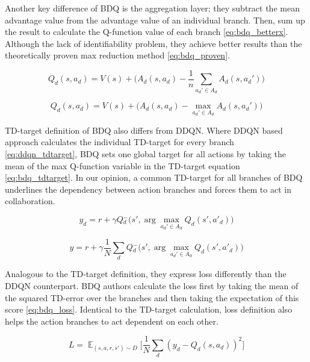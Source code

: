 Another key difference of BDQ is the aggregation layer; they subtract the mean advantage value from the advantage value of an individual branch. Then, sum up the result to calculate the Q-function value of each branch \ref{eq:bdq_betterx}. Although the lack of identifiability problem, they achieve better results than the theoretically proven max reduction method \ref{eq:bdq_proven}.

\begin{equation}
    Q_d(s, a_d) = V(s) + \Big(A_d(s, a_d) - \frac{1}{n} \sum\limits_{a_d'\in A_d}A_d(s, a_d')\Big)
    \label{eq:bdq_better}
\end{equation}


\begin{equation}
    Q_d(s, a_d) = V(s) + \Big(A_d(s, a_d) - \max\limits_{a_d'\in A_d}A_d(s, a_d')\Big)
    \label{eq:bdq_proven}
\end{equation}


TD-target definition of BDQ also differs from DDQN. Where DDQN based approach calculates the individual TD-target for every branch \ref{eq:ddqn_tdtarget}, BDQ sets one global target for all actions by taking the mean of the max Q-function variable in the TD-target equation \ref{eq:bdq_tdtarget}. In our opinion, a common TD-target for all branches of BDQ underlines the dependency between action branches and forces them to act in collaboration.

\begin{equation}
    y_d = r + \gamma Q{_d^-}\Big(s', \arg\max\limits_{a_d'\in A_d}Q_d(s', a'_d)\Big)
    \label{eq:ddqn_tdtarget}
\end{equation}

\begin{equation}
    y = r + \gamma \frac{1}{N} \sum\limits_d Q{_d^-}\Big(s', \arg\max\limits_{a_d'\in A_d}Q_d(s', a'_d)\Big)
    \label{eq:bdq_tdtarget}
\end{equation}


Analogous to the TD-target definition, they express loss differently than the DDQN counterpart. BDQ authors calculate the loss first by taking the mean of the squared TD-error over the branches and then taking the expectation of this score \ref{eq:bdq_loss}. Identical to the TD-target calculation, loss definition also helps the action branches to act dependent on each other.

\begin{equation}
    L = \mathop{\mathbb{E}}_{(s,a,r,s')\sim D} \Big[\frac{1}{N}\sum\limits_d(y_d-Q_d(s,a_d))^2]
    \label{eq:bdq_loss}
\end{equation}

